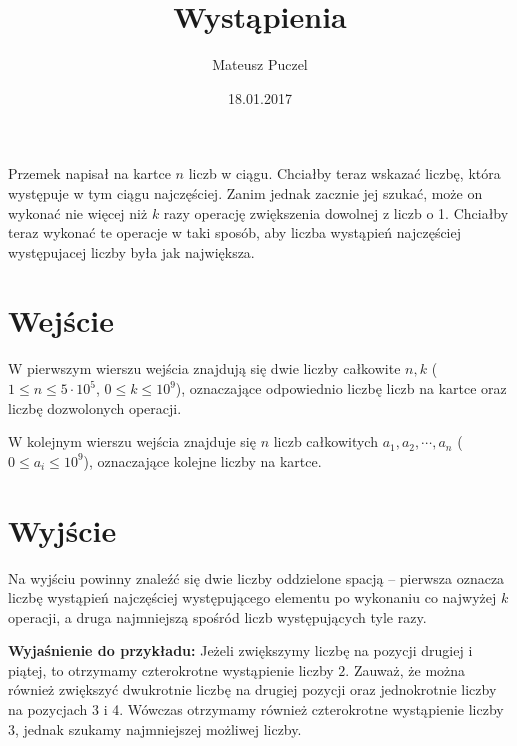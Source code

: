 \documentclass[zad,zawodnik,utf8]{sinol}
\title{Wystąpienia}
\author{Mateusz Puczel} %
\date{18.01.2017}
\begin{document}
\begin{tasktext}%

Przemek napisał na kartce $n$ liczb w ciągu. Chciałby teraz wskazać liczbę, która występuje w tym ciągu najczęściej. Zanim jednak zacznie jej szukać,
może on wykonać nie więcej niż $k$ razy operację zwiększenia dowolnej z liczb o 1. Chciałby teraz wykonać te operacje w taki sposób,
aby liczba wystąpień najczęściej występujacej liczby była jak największa.

  \section{Wejście}
W pierwszym wierszu wejścia znajdują się dwie liczby całkowite $n, k$ ($1 \leq n \leq 5 \cdot 10^5$, $0 \leq k \leq 10^9$), oznaczające odpowiednio
liczbę liczb na kartce oraz liczbę dozwolonych operacji.

W kolejnym wierszu wejścia znajduje się $n$ liczb całkowitych $a_1, a_2, \cdots, a_n$ ($0 \leq a_i \leq 10^9$), oznaczające kolejne liczby na kartce.

  \section{Wyjście}
Na wyjściu powinny znaleźć się dwie liczby oddzielone spacją -- pierwsza oznacza liczbę wystąpień najczęściej występującego elementu po wykonaniu co najwyżej $k$ operacji,
a druga najmniejszą spośród liczb występujących tyle razy.

\makecompactexample

\medskip
\noindent
\textbf{Wyjaśnienie do przykładu:} Jeżeli zwiększymy liczbę na pozycji drugiej i piątej, to otrzymamy czterokrotne wystąpienie liczby $2$.
Zauważ, że można również zwiększyć dwukrotnie liczbę na drugiej pozycji oraz jednokrotnie liczby na pozycjach 3 i 4. Wówczas otrzymamy również
czterokrotne wystąpienie liczby $3$, jednak szukamy najmniejszej możliwej liczby.

\end{tasktext}
\end{document}

